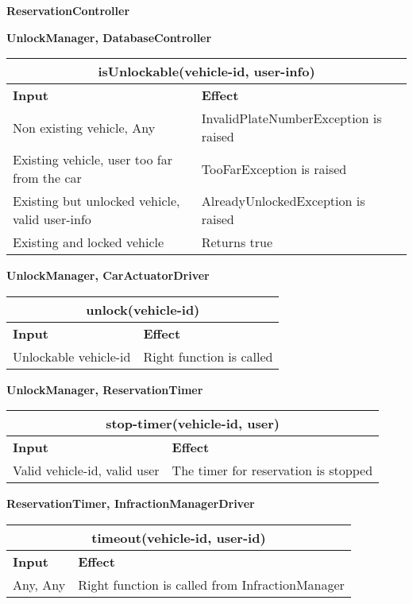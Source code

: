
\begin{Large}
\textbf{ReservationController}
\end{Large}

\textbf{UnlockManager, DatabaseController}\\
\begin{tabular}{|p{5cm}|p{7cm}|}
\hline
\multicolumn{2}{|c|}{isUnlockable(vehicle-id, user-info)}\\
\hline
\textbf{Input} & \textbf{Effect}\\

\hline
Non existing vehicle, Any & InvalidPlateNumberException is raised\\

\hline
Existing vehicle, user too far from the car & TooFarException is raised\\

\hline
Existing but unlocked vehicle, valid user-info & AlreadyUnlockedException is raised\\

\hline
Existing and locked vehicle & Returns true\\
\hline
\end{tabular}

\textbf{UnlockManager, CarActuatorDriver}\\
\begin{tabular}{|p{5cm}|p{7cm}|}
\hline
\multicolumn{2}{|c|}{unlock(vehicle-id)}\\
\hline
\textbf{Input} & \textbf{Effect}\\

\hline
Unlockable vehicle-id & Right function is called\\
\hline
\end{tabular}

\textbf{UnlockManager, ReservationTimer}\\
\begin{tabular}{|p{5cm}|p{7cm}|}
\hline
\multicolumn{2}{|c|}{stop-timer(vehicle-id, user)} \\
\hline
\textbf{Input} & \textbf{Effect} \\

\hline
Valid vehicle-id, valid user & The timer for reservation is stopped \\
\hline
\end{tabular}

\textbf{ReservationTimer, InfractionManagerDriver} \\
\begin{tabular}{|p{5cm}|p{7cm}|}
\hline
\multicolumn{2}{|c|}{timeout(vehicle-id, user-id)} \\
\hline
\textbf{Input} & \textbf{Effect} \\

\hline
Any, Any & Right function is called from InfractionManager \\
\hline
\end{tabular}


